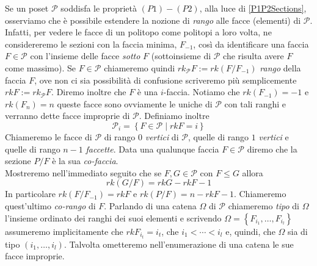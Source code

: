 \documentclass[a4paper,12pt]{report}
\newcommand{\p}{\mathcal{P}}
\theoremstyle{plain}
\theoremstyle{definition}
\begin{document}
\par
Se un poset $\p$ soddisfa le propriet\`a $(P1)-(P2)$, alla luce di \ref{P1P2Sections}, osserviamo che \`e possibile estendere la nozione di \emph{rango}
alle facce (elementi) di $\p$.\\
Infatti, per vedere le facce di un politopo come politopi a loro volta, ne considereremo le sezioni con la faccia minima, $F_{-1}$,
cos\`i da identificare una faccia $F\in\p$ con l'insieme delle facce \emph{sotto} $F$ (sottoinsieme di $\p$ che risulta avere $F$ come massimo).
Se $F\in\p$ chiameremo quindi $rk_\p F:=rk(F/F_{-1})$ \emph{rango} della faccia $F$, ove non ci sia possibilit\`a di confusione scriveremo
pi\`u semplicemente $rk F:=rk_\p F$. Diremo inoltre che $F$ \`e una $i$-faccia.
Notiamo che $rk(F_{-1})=-1$ e $rk(F_n)=n$ queste facce sono ovviamente le uniche di $\p$ con tali ranghi e verranno dette
facce improprie di $\p$.
Definiamo inoltre
\begin{equation*}
\p_i=\left\{F\in\p\mid rkF=i\right\}
\end{equation*}
Chiameremo le facce di $\p$ di rango $0$ \emph{vertici} di $\p$, quelle di rango $1$ \emph{vertici} e quelle di rango $n-1$ \emph{faccette}. Data 
una qualunque faccia $F\in\p$ diremo che la sezione $P/F$ \`e la sua \emph{co-faccia}.\\
Mostreremo nell'immediato seguito che se $F,G\in\p$ con $F\leq G$ allora
\begin{equation*}
rk(G/F)=rkG-rkF-1
\end{equation*}
In particolare $rk(F/F_{-1})=rkF$ e $rk(P/F)=n-rkF-1$. Chiameremo quest'ultimo \emph{co-rango} di $F$.
Parlando di una catena $\Omega$ di $\p$ chiameremo \emph{tipo} di $\Omega$ l'insieme ordinato dei ranghi dei suoi elementi e scrivendo 
$\Omega=\left\{F_{i_1},\dots,F_{i_l}\right\}$ assumeremo implicitamente che $rkF_{i_t}=i_t$, che $i_1<\cdots<i_l$ e, quindi,
che $\Omega$ sia di tipo $(i_1,\dots,i_l)$.
Talvolta ometteremo nell'enumerazione di una catena le sue facce improprie.\\
\end{document}
